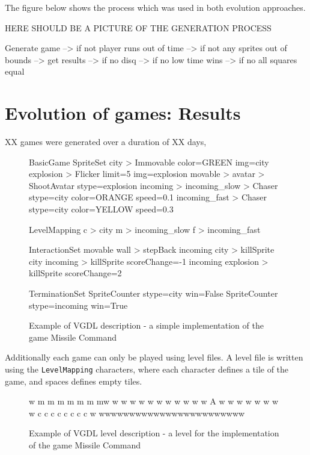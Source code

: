 \documentclass[a4paper,titlepage,final]{report}
\begin{document}
The figure below shows the process which was used in both evolution approaches.

HERE SHOULD BE A PICTURE OF THE GENERATION PROCESS


Generate game --> if not player runs out of time --> if not any sprites out of bounds --> get results --> if no disq --> if no low time wins --> if no all squares equal


\section{Evolution of games: Results}
\label{sec_task2evolvingGames}
XX games were generated over a duration of XX days, 


\begin{figure}[!ht]
\centering
\begin{vgdldesc}[linewidth=14cm]
BasicGame
	SpriteSet
		city  > Immovable color=GREEN img=city
		explosion > Flicker limit=5 img=explosion
		movable >
			avatar  > ShootAvatar stype=explosion
			incoming >
				incoming_slow  > Chaser stype=city color=ORANGE speed=0.1
				incoming_fast  > Chaser stype=city color=YELLOW speed=0.3

	LevelMapping
		c > city
		m > incoming_slow
		f > incoming_fast
		
	InteractionSet
		movable wall  > stepBack
		incoming city > killSprite
		city incoming > killSprite scoreChange=-1
		incoming explosion > killSprite scoreChange=2

	TerminationSet
		SpriteCounter stype=city   win=False
		SpriteCounter stype=incoming win=True
\end{vgdldesc}
\caption{Example of VGDL description - a simple implementation of the game Missile Command}
\label{fig:vgdlgame}
\end{figure}

Additionally each game can only be played using level files. 
A level file is written using the \texttt{LevelMapping} characters, where each character defines a tile of the game, and spaces defines empty tiles.

\begin{figure}[!ht]
\centering
\begin{vgdldesc}[linewidth=14cm]
w    m  m   m  m  m m mw
w                      w
w                      w
w                      w
w                      w
w                      w
w           A          w
w                      w
w                      w
w                      w
w   c c c c c c c c    w
wwwwwwwwwwwwwwwwwwwwwwww
\end{vgdldesc}
\caption{Example of VGDL level description - a level for the implementation of the game Missile Command}
\label{fig:vgdlgame_level}
\end{figure}
\end{document}
